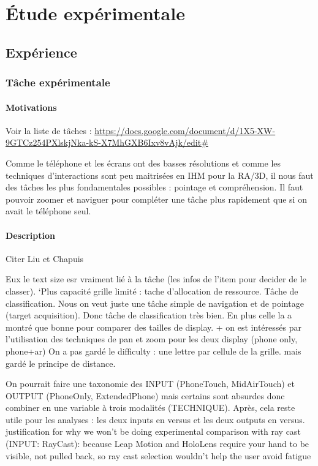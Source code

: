 \chapter{Étude expérimentale}
\label{ch:experiment}

\section{Expérience}
\subsection{Tâche expérimentale}
\label{sec:experiment_description}

\subsubsection{Motivations}
Voir la liste de tâches : \url{https://docs.google.com/document/d/1X5-XW-9GTCz254PXlskjNka-kS-X7MhGXB6Ixv8vAjk/edit#}

Comme le téléphone et les écrans ont des basses résolutions et comme les techniques d'interactions sont peu maitrisées en IHM pour la RA/3D\citep{Piumsomboon2013}, il nous faut des tâches les plus fondamentales possibles : pointage et compréhension. Il faut pouvoir zoomer et naviguer pour compléter une tâche plus rapidement que si on avait le téléphone seul.

\subsubsection{Description}
Citer Liu et Chapuis

Eux le text size esr vraiment lié à la tâche (les infos de l'item pour decider de le classer). `Plus capacité grille limité : tache d'allocation de ressource. Tâche de classification.
Nous on veut juste une tâche simple de navigation et de pointage (target acquisition). Donc tâche de classification très bien. En plus celle la a montré que bonne pour comparer des tailles de display. + on est intéressés par l'utilisation des techniques de pan et zoom pour les deux display (phone only, phone+ar)
On a pas gardé le difficulty : une lettre par cellule de la grille. mais gardé le principe de distance.

On pourrait faire une taxonomie des INPUT (PhoneTouch, MidAirTouch) et OUTPUT (PhoneOnly, ExtendedPhone) mais certains sont absurdes donc combiner en une variable à trois modalités (TECHNIQUE). Après, cela reste utile pour les analyses : les deux inputs en versus et les deux outputs en versus.
justification for why we won’t be doing experimental comparison with ray cast (INPUT: RayCast): because Leap Motion and HoloLens require your hand to be visible, not pulled back, so ray cast selection wouldn’t help the user avoid fatigue

